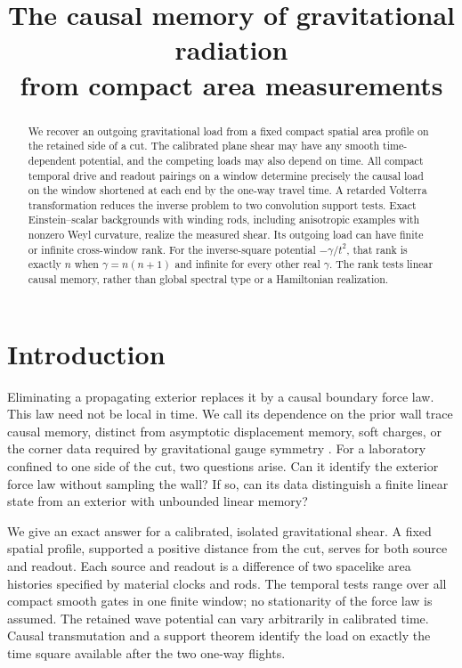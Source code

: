 \documentclass[11pt]{article}
\title{The causal memory of gravitational radiation\\from compact area measurements}
\author{}
\date{}
\numberwithin{equation}{section}
\begin{document}
\maketitle
\begin{abstract}
We recover an outgoing gravitational load from a fixed compact spatial area profile on the retained side of a cut. The calibrated plane shear may have any smooth time-dependent potential, and the competing loads may also depend on time. All compact temporal drive and readout pairings on a window determine precisely the causal load on the window shortened at each end by the one-way travel time. A retarded Volterra transformation reduces the inverse problem to two convolution support tests. Exact Einstein--scalar backgrounds with winding rods, including anisotropic examples with nonzero Weyl curvature, realize the measured shear. Its outgoing load can have finite or infinite cross-window rank. For the inverse-square potential \(-\gamma/t^2\), that rank is exactly \(n\) when \(\gamma=n(n+1)\) and infinite for every other real \(\gamma\). The rank tests linear causal memory, rather than global spectral type or a Hamiltonian realization.
\end{abstract}

\section{Introduction}
Eliminating a propagating exterior replaces it by a causal boundary force law. This law need not be local in time. We call its dependence on the prior wall trace causal memory, distinct from asymptotic displacement memory, soft charges, or the corner data required by gravitational gauge symmetry \cite{P44}. For a laboratory confined to one side of the cut, two questions arise. Can it identify the exterior force law without sampling the wall? If so, can its data distinguish a finite linear state from an exterior with unbounded linear memory?

We give an exact answer for a calibrated, isolated gravitational shear. A fixed spatial profile, supported a positive distance from the cut, serves for both source and readout. Each source and readout is a difference of two spacelike area histories specified by material clocks and rods. The temporal tests range over all compact smooth gates in one finite window; no stationarity of the force law is assumed. The retained wave potential can vary arbitrarily in calibrated time. Causal transmutation and a support theorem identify the load on exactly the time square available after the two one-way flights.
\end{document}
